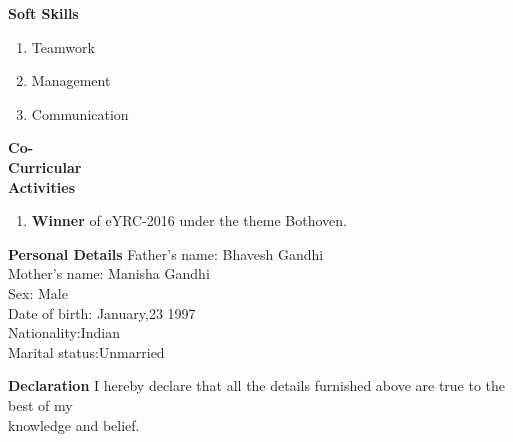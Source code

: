 \documentclass{article}
\begin{document}
	   \begin{flushleft} 
	     	 		
	     	 		\vspace{0.4in}
	     	 		\textbf{Soft Skills}
	     	 		\begin{enumerate}
	     	 			\vspace{-0.30in}
	     	 			\addtolength{\itemindent}{1.359in}
						\item Teamwork 
						\item Management	     	 			
	     	 			\item Communication  
	     	 			
	     	 		\end{enumerate}
	     	 	\end{flushleft}
	     	 	
	     
	   \begin{flushleft} 
	      	\vspace{0.4in}
	      	\textbf{Co- \\Curricular \\Activities }
	      	\begin{enumerate}
	      		\vspace{-0.65in}
	      		\addtolength{\itemindent}{1.359in}
	      		\item  \textbf{Winner} of eYRC-2016 under the theme Bothoven. 
	      	\end{enumerate}
	      \end{flushleft}
	      
	    \begin{flushleft}
	      	\vspace{0.4in}
	      	\textbf{Personal Details} \hspace{0.36in}Father's name: \hspace{0.13in} Bhavesh Gandhi \\
	      	\hspace{1.55in}Mother's name: \hspace{0.08in} Manisha Gandhi\\
	      	\hspace{1.55in}Sex:\hspace{0.85in} Male\\
	      	\hspace{1.55in}Date of birth:\hspace{0.255in} January,23 1997	\\
	      	\hspace{1.55in}Nationality:\hspace{0.45in}Indian\\
	      	\hspace{1.55in}Marital status:\hspace{0.28in}Unmarried
	      	
	      \end{flushleft}
	      
	         
	      \begin{flushleft}
	      	\vspace{0.2in}
	      	\textbf{Declaration} \hspace{0.60in}  I hereby declare that all the details furnished above are true to the best of
	      	my\\\hspace{3.7cm} knowledge and belief.
	      \end{flushleft}
	      
	      
	   
\end{document}
